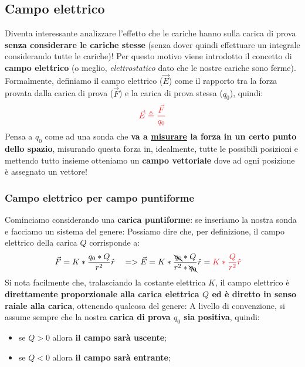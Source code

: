     \subsection{Campo elettrico}
        Diventa interessante analizzare l'effetto che le cariche hanno sulla carica di prova \textbf{senza considerare le cariche stesse} (senza dover quindi effettuare un integrale considerando tutte le cariche)! Per questo motivo viene introdotto il concetto di \textbf{campo elettrico} (o meglio, \textit{elettrostatico} dato che le nostre cariche sono ferme). Formalmente, definiamo il campo elettrico ($\vec{E}$) come il rapporto tra la forza provata dalla carica di prova ($\vec{F}$) e la carica di prova stessa ($q_0$), quindi:
        \begin{align*}
            \textcolor{Red}{\vec{E} \triangleq \frac{\vec{F}}{q_0}}
        \end{align*}
        Pensa a $q_0$ come ad una sonda che \textbf{va a \underline{misurare} la forza in un certo punto dello spazio}, misurando questa forza in, idealmente, tutte le possibili posizioni e mettendo tutto insieme otteniamo un \textbf{campo vettoriale} dove ad ogni posizione è assegnato un vettore!

        \subsubsection{Campo elettrico per campo puntiforme}
            Cominciamo considerando una \textbf{carica puntiforme}: se inseriamo la nostra sonda e facciamo un sistema del genere:
            Possiamo dire che, per definizione, il campo elettrico della carica $Q$ corrisponde a:
            \begin{align*}
                &\vec{F}=K*\frac{q_0*Q}{r^2}\hat{r}&&=>\vec{E}=K*\frac{\bcancel{q_0}*Q}{r^2*\bcancel{q_0}}\hat{r}=\textcolor{Red}{K*\frac{Q}{r^2}\hat{r}}
            \end{align*}
            Si nota facilmente che, tralasciando la costante elettrica $K$, il campo elettrico è \textbf{direttamente proporzionale alla carica elettrica $Q$ ed è diretto in senso raiale alla carica}, ottenendo qualcosa del genere:
            A livello di convenzione, si assume sempre che la nostra \textbf{carica di prova $q_0$ sia positiva}, quindi:
            \begin{itemize}
                \item se $Q>0$ allora \textbf{il campo sarà uscente};
                \item se $Q<0$ allora \textbf{il campo sarà entrante};
            \end{itemize}

